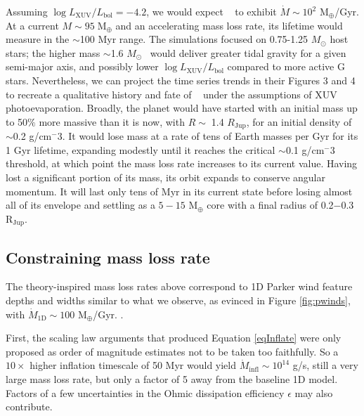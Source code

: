 \documentclass[twocolumn]{aastex631}
\newcommand{\hatp}{\object{HAT-P-67}~}
\newcommand{\hatpb}{\object{HAT-P-67 b}}
\begin{document}
Assuming $\log{L_\mathrm{XUV}/L_\mathrm{bol}}=-4.2$, we would expect \hatpb~ to exhibit $\dot{M}\sim10^2$ M$_\oplus$/Gyr. At a current $M\sim95\;$M$_\oplus$ and an accelerating mass loss rate, its lifetime would measure in the $\sim$100 Myr range.  The \citet{2023ApJ...945L..36T} simulations focused on 0.75-1.25 $M_\odot$ host stars; the higher mass $\sim$1.6 $M_\odot$ \hatp would deliver greater tidal gravity for a given semi-major axis, and possibly lower $\log{L_\mathrm{XUV}/L_\mathrm{bol}}$ compared to more active G stars.  Nevertheless, we can project the time series trends in their Figures 3 and 4 to recreate a qualitative history and fate of \hatpb~ under the assumptions of XUV photoevaporation.  Broadly, the planet would have started with an initial mass up to 50$\%$ more massive than it is now, with $R\sim\;$1.4 $R_\mathrm{Jup}$, for an initial density of $\sim$0.2 g/cm$^-3$.  It would lose mass at a rate of tens of Earth masses per Gyr for its 1 Gyr lifetime, expanding modestly until it reaches the critical $\sim$0.1 g/cm$^-3$ threshold, at which point the mass loss rate increases to its current value.  Having lost a significant portion of its mass, its orbit expands to conserve angular momentum.  It will last only tens of Myr in its current state before losing almost all of its envelope and settling as a $5-15$ M$_\oplus$ core with a final radius of 0.2$-$0.3 R$_\mathrm{Jup}$.


\subsection{Constraining mass loss rate}
The theory-inspired mass loss rates above correspond to 1D Parker wind  feature depths and widths similar to what we observe, as evinced in Figure \ref{fig:pwinds}, with $\dot{M}_\mathrm{1D}\sim100$ M$_\oplus$/Gyr.  .

First, the scaling law arguments that produced Equation \ref{eqInflate} were only proposed as order of magnitude estimates not to be taken too faithfully.  So a $10\times$ higher inflation timescale of 50 Myr would yield $\dot{M}_\mathrm{infl}\sim10^{14}$ g/s, still a very large mass loss rate, but only a factor of 5 away from the baseline 1D model.  Factors of a few uncertainties in the Ohmic dissipation efficiency $\epsilon$ may also contribute.
\end{document}
